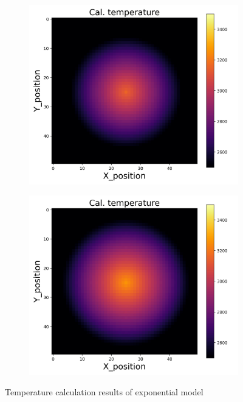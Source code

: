 {\begin{figure}[h]
\begin{minipage}{\textwidth}
\begin{subfigure}{0.27\textwidth}
        \end{subfigure}
        \begin{subfigure}{0.27\textwidth}
            \centering
            \includegraphics[width=\textwidth]{figures/raw_data/32/T3500/exp/T_cal.jpg}
        \end{subfigure}
        \begin{subfigure}{0.27\textwidth}
            \centering
            \includegraphics[width=\textwidth]{figures/raw_data/33/T3500/exp/T_cal.jpg}
        \end{subfigure}
    \end{minipage}
    \caption{Temperature calculation results of exponential model}  
\end{figure}

}
